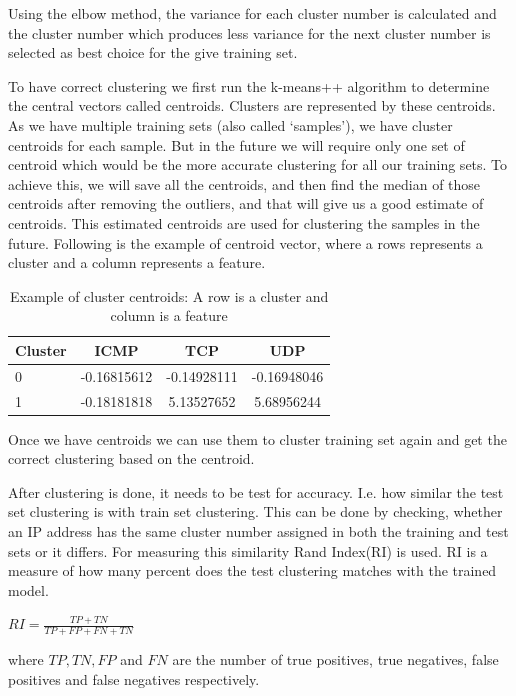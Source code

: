 \documentclass[12pt,oneside,a4paper]{article}
\begin{document}
Using the elbow method, the variance for each cluster number is calculated and the cluster number which produces less variance for the next cluster number is selected as best choice for the give training set.

To have correct clustering we first run the k-means++ algorithm to determine the central vectors called centroids. Clusters are represented by these centroids. As we have multiple training sets (also called `samples'), we have cluster centroids for each sample. But in the future we will require only one set of centroid which would be the more accurate clustering for all our training sets. To achieve this, we will save all the centroids, and then find the median of those centroids after removing the outliers, and that will give us a good estimate of centroids. This estimated centroids are used for clustering the samples in the future. Following is the example of centroid vector, where a rows represents a cluster and a column represents a feature.

\begin{table}[H]
\centering
  \begin{tabular}{ l | c  c  c }
    Cluster      & ICMP  & TCP  & UDP \\
    \hline
    0         &{-0.16815612}       &{-0.14928111}    &{-0.16948046} \\
    1         &{-0.18181818}       &{5.13527652}     &{5.68956244} \\
  \end{tabular}
\caption{Example of cluster centroids: A row is a cluster and column is a feature} \label{table:centroids-example}
\end{table}

Once we have centroids we can use them to cluster training set again and get the correct clustering based on the centroid.

After clustering is done, it needs to be test for accuracy. I.e. how similar the test set clustering is with train set clustering. This can be done by checking, whether an IP address has the same cluster number assigned in both the training and test sets or it differs. For measuring this similarity Rand Index(RI)\cite{ri-index} is used. RI is a measure of how many percent does the test clustering matches with the trained model.

\hspace{4cm} $RI={\frac {TP+TN}{TP+FP+FN+TN}}$

where $TP, TN, FP$ and $FN$ are the number of true positives, true negatives, false positives and false negatives respectively.
\end{document}
